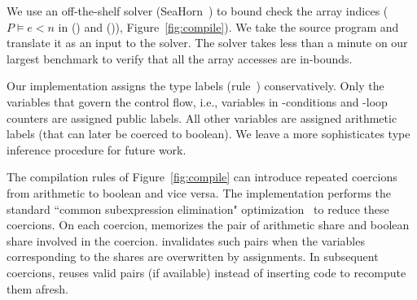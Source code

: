 We use an off-the-shelf solver
(SeaHorn~\cite{seahorn}) to bound check the array indices
($P\vDash e < n$
in ({}) and ({})),
Figure~\ref{fig:compile}). We take the \tool source program and
translate it as an input to the solver. The solver takes less
than a minute on our largest benchmark to verify that all the array
accesses are in-bounds.

Our implementation assigns the type labels (rule~{})
conservatively. Only the variables that govern the control flow, i.e.,
variables in -conditions and -loop counters are
assigned public labels.
All other variables are assigned arithmetic labels (that can later be
coerced to boolean).
We leave a more sophisticates type inference procedure for future work.

The compilation rules of Figure~\ref{fig:compile} can introduce
repeated coercions from arithmetic to
boolean and vice versa.
The \tool implementation performs  the standard ``common subexpression elimination"
optimization~\cite{dragonbook} to reduce these coercions.
On each coercion, \tool memorizes the pair of arithmetic
share and boolean share involved in the coercion. 
\tool invalidates such pairs when the variables corresponding to the
shares are overwritten by assignments. 
In subsequent coercions, \tool  reuses valid pairs (if available)
instead of inserting code to recompute them afresh. 
